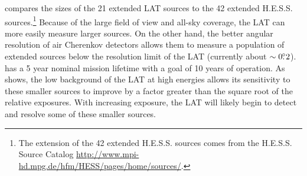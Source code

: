  compares the sizes of the 21 extended
LAT sources to the 42 extended H.E.S.S. sources.\footnote{The 
\tev extension of
the 42 extended H.E.S.S. sources comes from the H.E.S.S. Source
Catalog \url{http://www.mpi-hd.mpg.de/hfm/HESS/pages/home/sources/}.}
Because of the large
field of view and all-sky coverage, the LAT can more easily measure
larger sources.  On the other hand, the 
better
angular resolution of air Cherenkov detectors allows them to measure a
population of extended sources below the resolution limit of the LAT (currently 
about $\sim0\mbox{$.\!\!^\circ$}2$).  \fermi has a 5 year nominal mission lifetime with
a goal of 10 years of operation.  As  shows,
the low background of the LAT at high energies allows its sensitivity 
to
these smaller sources to improve by a factor greater than the square root
of the relative exposures.  With increasing exposure, the LAT will likely begin to
detect and resolve some of these smaller \tev sources.

